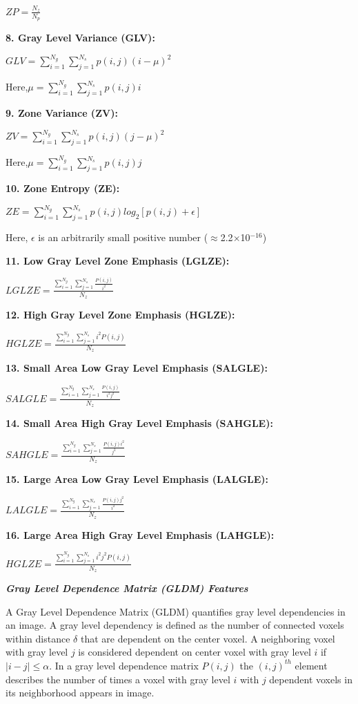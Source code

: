 $ZP=\frac{N_{z}}{N_{p}}$

\textbf{8. Gray Level Variance (GLV):}

$GLV=\sum _{i=1}^{N_{g}}\sum _{j=1}^{N_{s}}p\left(i,j\right)\left(i-\mu \right)^{2}$

Here,$\mu =\sum _{i=1}^{N_{g}}\sum _{j=1}^{N_{s}}p\left(i,j\right)i$

\textbf{9. Zone Variance (ZV):}

$ZV=\sum _{i=1}^{N_{g}}\sum _{j=1}^{N_{s}}p\left(i,j\right)\left(j-\mu \right)^{2}$

Here,$\mu =\sum _{i=1}^{N_{g}}\sum _{j=1}^{N_{s}}p\left(i,j\right)j$

\textbf{10. Zone Entropy (ZE):}

$ZE=\sum _{i=1}^{N_{g}}\sum _{j=1}^{N_{s}}p\left(i,j\right)log_{2}\left[p\left(i,j\right)+\epsilon \right]$

Here, $\epsilon $ is an arbitrarily small positive number (${\approx}$2.2${\times}$10$^{-16}$)

\textbf{11. Low Gray Level Zone Emphasis (LGLZE):}

$\textit{LGLZE}=\frac{\sum _{i=1}^{N_{g}}\sum _{j=1}^{N_{s}}\frac{P\left(i,j\right)}{i^{2}}}{N_{z}}$

\textbf{12. High Gray Level Zone Emphasis (HGLZE):}

$\textit{HGLZE}=\frac{\sum _{i=1}^{N_{g}}\sum _{j=1}^{N_{s}}i^{2}P\left(i,j\right)}{N_{z}}$

\textbf{13. Small Area Low Gray Level Emphasis (SALGLE):}

$\textit{SALGLE}=\frac{\sum _{i=1}^{N_{g}}\sum _{j=1}^{N_{s}}\frac{P\left(i,j\right)}{i^{2}j^{2}}}{N_{z}}$

\textbf{14. Small Area High Gray Level Emphasis (SAHGLE):}

$\textit{SAHGLE}=\frac{\sum _{i=1}^{N_{g}}\sum _{j=1}^{N_{s}}\frac{P\left(i,j\right)i^{2}}{j^{2}}}{N_{z}}$

\textbf{15. Large Area Low Gray Level Emphasis (LALGLE):}

$\textit{LALGLE}=\frac{\sum _{i=1}^{N_{g}}\sum _{j=1}^{N_{s}}\frac{P\left(i,j\right)j^{2}}{i^{2}}}{N_{z}}$

\textbf{16. Large Area High Gray Level Emphasis (LAHGLE):}

$\textit{HGLZE}=\frac{\sum _{i=1}^{N_{g}}\sum _{j=1}^{N_{s}}i^{2}j^{2}P\left(i,j\right)}{N_{z}}$

\textbf{\textit{Gray Level Dependence Matrix (GLDM) Features}}

A Gray Level Dependence Matrix (GLDM) quantifies gray level dependencies in an image. A gray level dependency is defined as the number of connected voxels within distance $\delta $ that are dependent on the center voxel. A neighboring voxel with gray level $j$ is considered dependent on center voxel with gray level $i$ if $\left| i-j\right| \leq \alpha $. In a gray level dependence matrix $P\left(i,j\right)$ the $\left(i,j\right)^{th}$ element describes the number of times a voxel with gray level $i$ with $j$ dependent voxels in its neighborhood appears in image.

